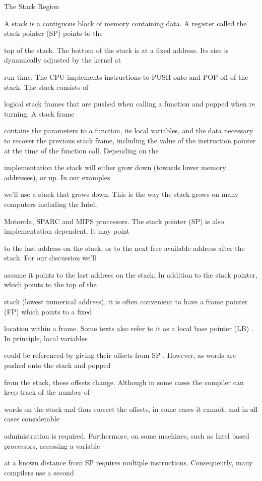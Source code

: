 \documentclass[10pt]{article}
\begin{document}
The Stack Region

A stack is a contiguous block of memory containing data. A register called the stack pointer (SP) points to the 

top of the stack. The bottom of the stack is at a fixed address. Its size is dynamically adjusted by the kernel at 

run time. The CPU implements instructions to PUSH onto and POP off of the stack. The stack consists of 

logical stack frames  that are pushed when calling a function and popped when re turning. A stack frame 

contains the parameters to a function, its local variables, and the data necessary to recover the previous stack frame, including the value of the instruction pointer at the time of the function call. Depending on the 

implementation the stack will either grow down (towards lower memory addresses), or up. In our examples 

we'll use a stack that grows down. This is the way the stack grows on many computers including the Intel, 

Motorola, SPARC and MIPS processors. The  stack pointer (SP) is also implementation dependent.  It may point 

to the last address on the stack, or to the next free available address after the stack. For our discussion we'll 

assume it points to the last address on the stack. In addition to the stack pointer, which points to the top of the 

stack (lowest numerical address), it is often convenient to have a frame pointer (FP) which points to a fixed 

location within a frame. Some texts also refer to it as a local base pointer (LB) . In principle, local variables 

could be referenced by giving their offsets from SP . However, as words are pushed onto the stack and popped 

from the stack, these offsets change. Although in some cases the compiler can keep track of the number of 

words on the stack and thus correct the offsets, in some cases it cannot, and in all cases  considerable 

administration is required. Furthermore, on some machines, such as Intel based processors, accessing a variable 

at a known distance from SP requires multiple instructions. Consequently, many compilers use a second 
\end{document}
